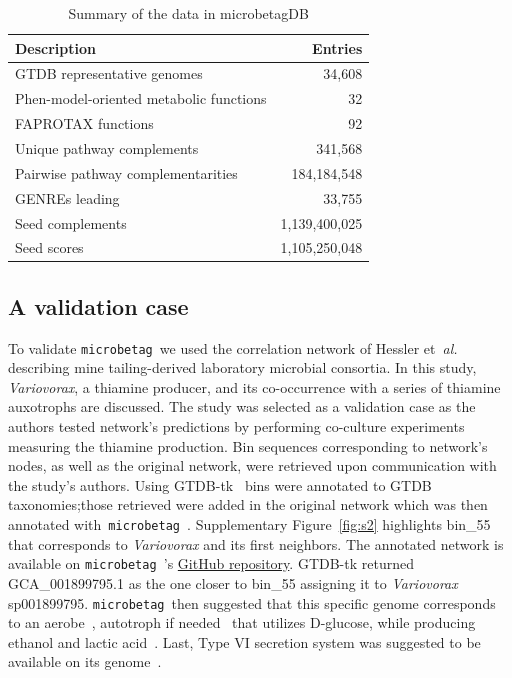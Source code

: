 \documentclass[sn-mathphys,Numbered]{sn-jnl}  %
\theoremstyle{thmstyleone}%
\theoremstyle{thmstyletwo}%
\theoremstyle{thmstylethree}%
\newcommand{\microbetag}{\texttt{microbetag }}
\begin{document}
        \begin{table}[h!]
            \caption[Summary of Data]{
                Summary of the data in microbetagDB
            }
            \label{tab:db}
            \begin{tabular}{lr}
                \toprule
                Description & Entries \\
                \midrule
                GTDB representative genomes & 34,608 \\
                Phen-model-oriented metabolic functions & 32 \\
                FAPROTAX functions & 92 \\
                Unique pathway complements & 341,568 \\
                Pairwise pathway complementarities & 184,184,548\\
                GENREs leading  & 33,755 \\
                Seed complements & 1,139,400,025\\
                Seed scores & 1,105,250,048 \\
                \bottomrule
            \end{tabular}
        \end{table}


    \subsection*{A validation case}
    \label{subsec:validation}


        To validate \microbetag we used the correlation network of Hessler et~\textit{al.}~\cite{hessler2023vitamin} describing mine tailing-derived laboratory microbial consortia.
        In this study, \textit{Variovorax}, a thiamine producer, and its co-occurrence with a series of thiamine auxotrophs are discussed.
        The study was selected as a validation case as the authors tested network's predictions by performing co-culture experiments measuring the thiamine production.
        Bin sequences corresponding to network's nodes, as well as the original network, were retrieved upon communication with the study's authors. 
        Using GTDB-tk~\cite{chaumeil2020gtdb} bins were annotated to GTDB taxonomies;those retrieved were added in the original network which was then annotated with~\microbetag.
        Supplementary Figure~\ref{fig:s2} highlights bin\_55 that corresponds to \textit{Variovorax} and its first neighbors.
        The annotated network is available on \microbetag's \href{https://github.com/hariszaf/microbetag/blob/develop/tests/validation_case/microbetag_val.cx}{GitHub repository}.
        GTDB-tk returned GCA\_001899795.1 as the one closer to bin\_55 assigning it to \textit{Variovorax} sp001899795.
        \microbetag then suggested that this specific genome corresponds to an aerobe~\cite{aerobeVariovorax}, autotroph if needed~\cite{autotrophVariovorax} that utilizes D-glucose, while producing ethanol and lactic acid~\cite{lacticVariovorax}. 
        Last, Type VI secretion system was suggested to be available on its genome~\cite{t6ssVariovorax}.
\end{document}
